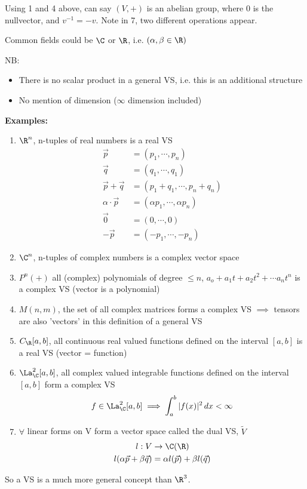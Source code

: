 \documentclass[cplx.tex]{subfiles}
\begin{document}
Using 1 and 4 above, can say $(V,+)$ is an abelian group, where 0 is the nullvector, and $v^{-1}=-v$.
Note in 7, two different operations appear.

Common fields could be $\C$ or $\R$, i.e. $(\alpha,\beta \in \R)$

NB:
\begin{itemize}
    \item There is no scalar product in a general VS, i.e. this is an additional structure
    \item No mention of dimension ($\infty$ dimension included)
\end{itemize}

\textbf{Examples:}
\begin{enumerate}
    \item $\R^n$, n-tuples of real numbers is a real VS
        \begin{align}
            \vec{p} &= (p_1,\cdots,p_n) \\
            \vec{q} &= (q_1,\cdots,q_1) \\
            \vec{p} + \vec{q} &= (p_1+q_1,\cdots,p_n+q_n) \\
            \alpha\cdot\vec{p} &= (\alpha p_1,\cdots,\alpha p_n) \\
            \vec{0} &= (0,\cdots,0) \\
            -\vec{p} &= (-p_1,\cdots,-p_n)
        \end{align}
    \item $\C^n$, n-tuples of complex numbers is a complex vector space
    \item $P^n(+)$ all (complex) polynomials of degree $\leq n$, $a_o + a_1t + a_2t^2 + \cdots a_nt^n$ is a complex VS (vector is a polynomial)
    \item $M(n,m)$, the set of all complex matrices forms a complex VS $\implies$ tensors are also 'vectors' in this definition of a general VS
    \item $C_{\R}[a,b]$, all continuous real valued functions defined on the interval $[a,b]$ is a real VS (vector = function)
    \item $\La^2_{\C}[a,b]$, all complex valued integrable functions defined on the interval $[a,b]$ form a complex VS
        \begin{equation}
            f \in \La^2_{\C}[a,b] \implies \int_a^b |f(x)|^2\,dx < \infty
        \end{equation}
    \item $\forall$ linear forms on V form a vector space called the dual VS, $\tilde{V}$
        \begin{align}
            l: V &\to \C(\R) \\
            l(\alpha\vec{p} + \beta\vec{q}) &= \alpha l(\vec{p}) + \beta l(\vec{q})
        \end{align}
\end{enumerate}
So a VS is a much more general concept than $\R^3$.
\end{document}
